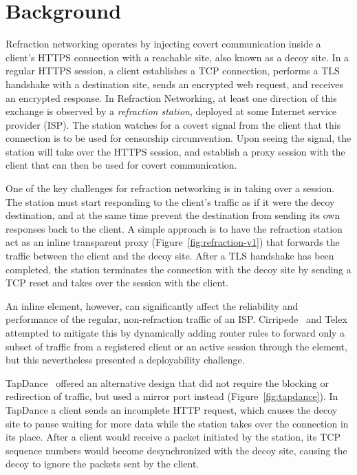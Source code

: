 \section{Background}

Refraction networking operates by injecting covert communication inside a
client's HTTPS connection with a reachable site, also known as a decoy site. In
a regular HTTPS session, a client establishes a TCP connection, performs a TLS
handshake with a destination site, sends an encrypted web request, and
receives an encrypted response. In Refraction Networking, at least one direction
of this exchange is observed by a \emph{refraction station}, deployed at
some Internet service provider (ISP). The station watches for a covert signal from
the client that this connection is to be used for censorship circumvention.
Upon seeing the signal, the station will take over the HTTPS session,
and establish a proxy session with the client that can then be used for covert
communication.

\FigEvolution

One of the key challenges for refraction networking is in taking over a session. The station must start responding to the client's traffic as if it were the decoy destination, and at the same time prevent the destination from sending its own responses back to the client. A simple approach is to have the refraction station act as an inline transparent proxy (Figure~\ref{fig:refraction-v1}) that forwards the traffic between the client and the decoy site. After a TLS handshake has been completed, the station terminates the connection with the decoy site by sending a TCP reset and takes over the session with the client.

An inline element, however, can significantly affect the reliability and performance of the regular, non-refraction traffic of an ISP. Cirripede~\cite{cirripede11} and Telex~\cite{telex11} attempted to mitigate this by dynamically adding router rules to forward only a subset of traffic from a registered client or an active session through the element, but this nevertheless presented a deployability challenge.

TapDance~\cite{tapdance14} offered an alternative design that did not require the blocking or redirection of traffic, but used a mirror port instead (Figure~\ref{fig:tapdance}). In TapDance a client sends an incomplete HTTP request, which causes the decoy site to pause waiting for more data while the station takes over the connection in its place. After a client would receive a packet initiated by the station, its TCP sequence numbers would become desynchronized with the decoy site, causing the decoy to ignore the packets sent by the client.

